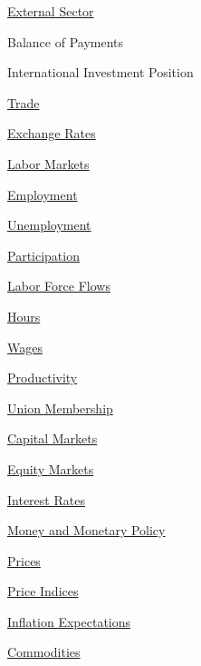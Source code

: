 \documentclass{report}
\begin{document}
\begin{minipage}{0.4\textwidth}
\begin{description}
\item {\hyperlink{ext}{External Sector}}
\begin{description}
\item Balance of Payments
\item International Investment Position
\item {\hyperlink{extt}{Trade}}
\item {\hyperlink{extfx}{Exchange Rates}}
\end{description}
\item {\hyperlink{lab}{Labor Markets}}
\begin{description}
\item {\hyperlink{labe}{Employment}}
\item {\hyperlink{labu}{Unemployment}}
\item {\hyperlink{labp}{Participation}}
\item {\hyperlink{labf}{Labor Force Flows}}
\item {\hyperlink{labh}{Hours}}
\item {\hyperlink{labw}{Wages}}
\item {\hyperlink{labprod}{Productivity}}
\item {\hyperlink{labun}{Union Membership}}
\end{description}
\item {\hyperlink{cap}{Capital Markets}}
\begin{description}
\item {\hyperlink{capeq}{Equity Markets}}
\item {\hyperlink{capint}{Interest Rates}}
\item {\hyperlink{capmm}{Money and Monetary Policy}}
\end{description}
\item {\hyperlink{pr}{Prices}}
\begin{description}
\item {\hyperlink{prin}{Price Indices}}
\item {\hyperlink{prie}{Inflation Expectations}}
\item {\hyperlink{prco}{Commodities}}
\end{description}
\end{description}
\vspace{1.2cm}

\end{minipage}
\vspace{6mm}
\end{document}
